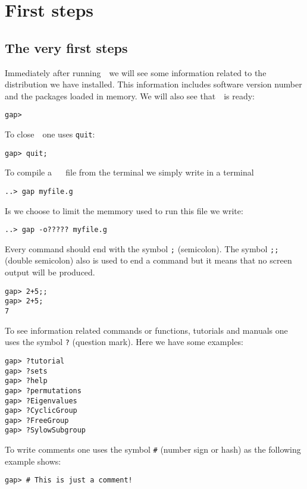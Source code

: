\chapter{First steps}
\label{first} 

\section{The very first steps}
\label{section:primeros_pasos}

Immediately after running~\GAP~we will see some information related to the
distribution we have installed.  This information includes software version
number and the packages loaded in memory. 
We will also see that~\GAP~is ready:
\begin{lstlisting}
gap>
\end{lstlisting}

To close~\GAP~one uses \lstinline{quit}:
\begin{lstlisting}
gap> quit;
\end{lstlisting}


To compile a ~\GAP~ file from the terminal we simply write in a terminal
\begin{lstlisting}
..> gap myfile.g
\end{lstlisting}
Is we choose to limit the memmory used to run this file we write:
\begin{lstlisting}
..> gap -o????? myfile.g
\end{lstlisting}


Every command should end with the symbol \lstinline{;} (semicolon). The symbol
\lstinline{;;} (double semicolon) also is used to end a command but it means
that no screen output will be produced. 

\begin{lstlisting}
gap> 2+5;;
gap> 2+5;
7
\end{lstlisting}

To see information related commands or functions, tutorials and manuals one
uses the symbol \lstinline{?} (question mark). Here we have some examples:
\begin{lstlisting}
gap> ?tutorial
gap> ?sets
gap> ?help
gap> ?permutations
gap> ?Eigenvalues
gap> ?CyclicGroup
gap> ?FreeGroup
gap> ?SylowSubgroup
\end{lstlisting}

To write comments one uses the symbol \lstinline{#} (number sign or hash) as
the following example shows:
\begin{lstlisting}
gap> # This is just a comment!
\end{lstlisting}

